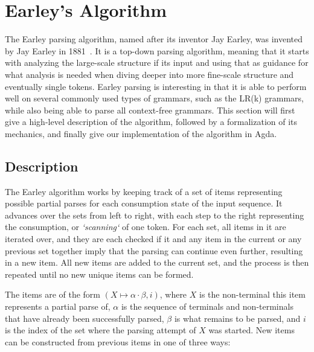 \chapter{Earley's Algorithm} \label{Earleys}

	The Earley parsing algorithm, named after its inventor Jay Earley, was
	invented by Jay Earley in 1881~\cite{Earley}. It is a top-down parsing
	algorithm, meaning that it starts with analyzing the large-scale structure
	if its input and using that as guidance for what analysis is needed when
	diving deeper into more fine-scale structure and eventually single tokens.
	Earley parsing is interesting in that it is able to perform well on
	several commonly used types of grammars, such as the LR(k) grammars, while
	also being able to parse all context-free grammars. This section will first
	give a high-level description of the algorithm, followed by a formalization
	of its mechanics, and finally give our implementation of the algorithm in
	Agda.

	\section{Description}

		The Earley algorithm works by keeping track of a set of items
		representing possible partial parses for each consumption state of the
		input sequence. It advances over the sets from left to right, with each
		step to the right representing the consumption, or \emph{`scanning`} of
		one token. For each set, all items in it are iterated over, and they
		are each checked if it and any item in the current or any previous set
		together imply that the parsing can continue even further, resulting in
		a new item. All new items are added to the current set, and the process
		is then repeated until no new unique items can be formed.

		The items are of the form $(X \mapsto \alpha \cdot \beta, i)$, where
		$X$ is the non-terminal this item represents a partial parse of,
		$\alpha$ is the sequence of terminals and non-terminals that have
		already been successfully parsed, $\beta$ is what remains to be parsed,
		and $i$ is the index of the set where the parsing attempt of $X$ was
		started. New items can be constructed from previous items in one of
		three ways:

